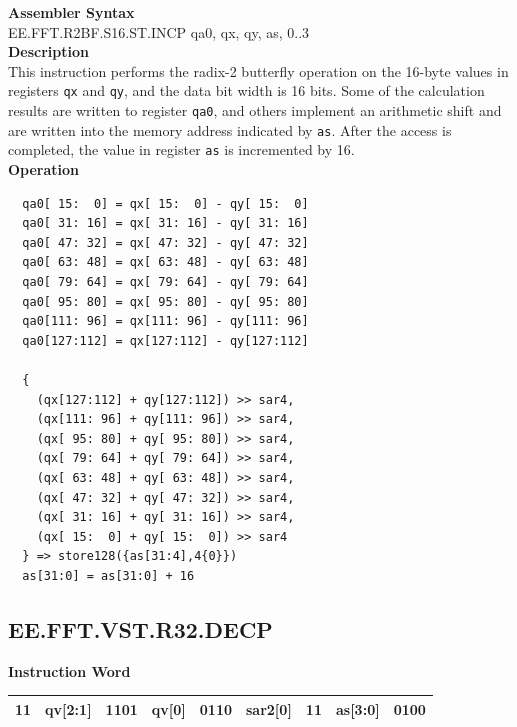 \textbf{Assembler Syntax} \\
EE.FFT.R2BF.S16.ST.INCP qa0, qx, qy, as, 0..3 \\
\textbf{Description} \\
This instruction performs the radix-2 butterfly operation on the 16-byte values in registers \lstinline{qx} and \lstinline{qy}, and the data bit width is 16 bits. Some of the calculation results are written to register \lstinline{qa0}, and others implement an arithmetic shift and are written into the memory address indicated by \lstinline{as}. After the access is completed, the value in register \lstinline{as} is incremented by 16.\\
\textbf{Operation}
\begin{lstlisting}
  qa0[ 15:  0] = qx[ 15:  0] - qy[ 15:  0]
  qa0[ 31: 16] = qx[ 31: 16] - qy[ 31: 16]
  qa0[ 47: 32] = qx[ 47: 32] - qy[ 47: 32]
  qa0[ 63: 48] = qx[ 63: 48] - qy[ 63: 48]
  qa0[ 79: 64] = qx[ 79: 64] - qy[ 79: 64]
  qa0[ 95: 80] = qx[ 95: 80] - qy[ 95: 80]
  qa0[111: 96] = qx[111: 96] - qy[111: 96]
  qa0[127:112] = qx[127:112] - qy[127:112]

  {
    (qx[127:112] + qy[127:112]) >> sar4,
    (qx[111: 96] + qy[111: 96]) >> sar4,
    (qx[ 95: 80] + qy[ 95: 80]) >> sar4,
    (qx[ 79: 64] + qy[ 79: 64]) >> sar4,
    (qx[ 63: 48] + qy[ 63: 48]) >> sar4,
    (qx[ 47: 32] + qy[ 47: 32]) >> sar4,
    (qx[ 31: 16] + qy[ 31: 16]) >> sar4,
    (qx[ 15:  0] + qy[ 15:  0]) >> sar4
  } => store128({as[31:4],4{0}})
  as[31:0] = as[31:0] + 16
\end{lstlisting}

\clearpage
\subsection{EE.FFT.VST.R32.DECP}\label{instruction:EEFFTVSTR32DECP}
\setlength\tabcolsep{6pt}
\textbf{Instruction Word} \\
\begin{tabular}{|c|c|c|c|c|c|c|c|c|}
	\hline
	11 & qv[2:1] & 1101 & qv[0] & 0110 & sar2[0] & 11 & as[3:0] & 0100 \\
	\hline
\end{tabular}

